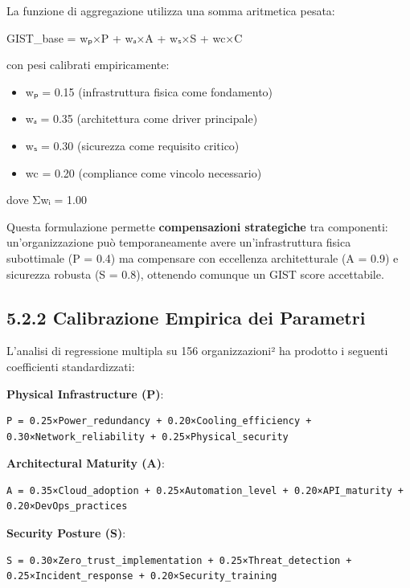 \documentclass[12pt,a4paper,oneside]{book}
\providecommand{\tightlist}{%
  \setlength{\itemsep}{0pt}\setlength{\parskip}{0pt}
}
\numberwithin{figure}{chapter} %
\numberwithin{table}{chapter}  %
\begin{document}
La funzione di aggregazione utilizza una somma aritmetica pesata:

GIST\_base = wₚ×P + wₐ×A + wₛ×S + wc×C

con pesi calibrati empiricamente:

\begin{itemize}
\tightlist
\item
  wₚ = 0.15 (infrastruttura fisica come fondamento)\\
\item
  wₐ = 0.35 (architettura come driver principale)\\
\item
  wₛ = 0.30 (sicurezza come requisito critico)\\
\item
  wc = 0.20 (compliance come vincolo necessario)
\end{itemize}

dove Σwᵢ = 1.00

Questa formulazione permette \textbf{compensazioni strategiche} tra
componenti: un'organizzazione può temporaneamente avere
un'infrastruttura fisica subottimale (P = 0.4) ma compensare con
eccellenza architetturale (A = 0.9) e sicurezza robusta (S = 0.8),
ottenendo comunque un GIST score accettabile.

\subsection{5.2.2 Calibrazione Empirica dei
Parametri}\label{calibrazione-empirica-dei-parametri}

L'analisi di regressione multipla su 156 organizzazioni² ha prodotto i
seguenti coefficienti standardizzati:

\textbf{Physical Infrastructure (P)}:

\begin{verbatim}
P = 0.25×Power_redundancy + 0.20×Cooling_efficiency + 0.30×Network_reliability + 0.25×Physical_security
\end{verbatim}

\textbf{Architectural Maturity (A)}:

\begin{verbatim}
A = 0.35×Cloud_adoption + 0.25×Automation_level + 0.20×API_maturity + 0.20×DevOps_practices
\end{verbatim}

\textbf{Security Posture (S)}:

\begin{verbatim}
S = 0.30×Zero_trust_implementation + 0.25×Threat_detection + 0.25×Incident_response + 0.20×Security_training
\end{verbatim}
\end{document}
